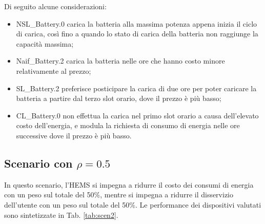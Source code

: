 \documentclass[italian, Lau, oneside]{sapthesis}
\begin{document}
Di seguito alcune considerazioni:
\begin{itemize}
    \item NSL\_Battery.0 carica la batteria alla massima potenza appena inizia il ciclo di carica, così fino a quando lo stato di carica della batteria non raggiunge la capacità massima;
    \item Naif\_Battery.2 carica la batteria nelle ore che hanno costo minore relativamente al prezzo;
    \item SL\_Battery.2 preferisce posticipare la carica di due ore per poter caricare la batteria a partire dal terzo slot orario, dove il prezzo è più basso;
    \item CL\_Battery.0 non effettua la carica nel primo slot orario a causa dell'elevato costo dell'energia, e modula la richiesta di consumo di energia nelle ore successive dove il prezzo è più basso.
\end{itemize}

































\subsection{Scenario con $\rho = 0.5$}
In questo scenario, l'HEMS si impegna a ridurre il costo dei consumi di energia con un peso sul totale del 50\%, mentre si impegna a ridurre il disservizio dell'utente con un peso sul totale del 50\%. Le performance dei dispositivi valutati sono sintetizzate in Tab. \ref{tab:scen2}.
\end{document}

